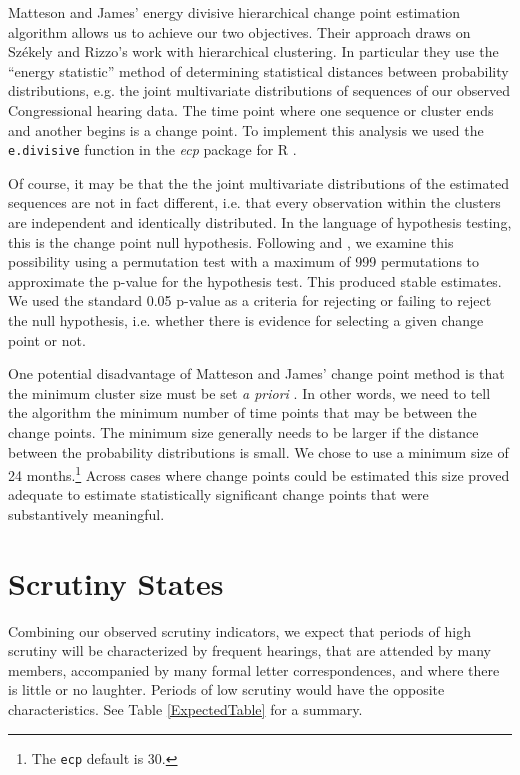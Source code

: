 \documentclass[a4paper]{article}\usepackage[]{graphicx}\usepackage[]{color}
\begin{document}
Matteson and James' \citeyearpar{Matteson2014} energy divisive hierarchical change point estimation algorithm allows us to achieve our two objectives. Their approach draws on Sz{\'e}kely and Rizzo's \citeyearpar{Szekely2005} work with hierarchical clustering. In particular they use the ``energy statistic'' method of determining statistical distances between probability distributions, e.g. the joint multivariate distributions of sequences of our observed Congressional hearing data. The time point where one sequence or cluster ends and another begins is a change point. To implement this analysis we used the \texttt{e.divisive} function in the \emph{ecp}  \citep{R-ecp} package for R \citep{CiteR}.

Of course, it may be that the the joint multivariate distributions of the estimated sequences are not in fact different, i.e. that every observation within the clusters are independent and identically distributed. In the language of hypothesis testing, this is the change point null hypothesis. Following \cite{Matteson2014} and \cite{Rizzo2010}, we examine this possibility using a permutation test with a maximum of 999 permutations to approximate the p-value for the hypothesis test. This produced stable estimates. We used the standard 0.05 p-value as a criteria for rejecting or failing to reject the null hypothesis, i.e. whether there is evidence for selecting a given change point or not.

One potential disadvantage of Matteson and James' change point method is that the minimum cluster size must be set \emph{a priori} \citeyearpar[11]{Matteson2014}. In other words, we need to tell the algorithm the minimum number of time points that may be between the change points. The minimum size generally needs to be larger if the distance between the probability distributions is small. We chose to use a minimum size of 24 months.\footnote{The \texttt{ecp} default is 30.} Across cases where change points could be estimated this size proved adequate to estimate statistically significant change points that were substantively meaningful.

\section{Scrutiny States}

Combining our observed scrutiny indicators, we expect that periods of high scrutiny will be characterized by frequent hearings, that are attended by many members, accompanied by many formal letter correspondences, and where there is little or no laughter. Periods of low scrutiny would have the opposite characteristics. See Table \ref{ExpectedTable} for a summary.
\end{document}

